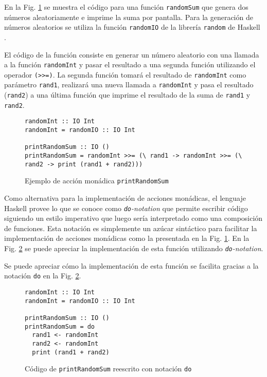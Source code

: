 En la Fig. \ref{fig:functional-randomSum} se muestra el código para una función \texttt{randomSum} que genera dos números aleatoriamente e imprime la suma por pantalla. Para la generación de números aleatorios se utiliza la función \texttt{randomIO} de la librería \texttt{random} de Haskell \cite{random}.

El código de la función consiste en generar un número aleatorio con una llamada a la función \texttt{randomInt} y pasar el resultado a una segunda función utilizando el operador \texttt{(>>=)}. La segunda función tomará el resultado de \texttt{randomInt} como parámetro \texttt{rand1}, realizará una nueva llamada a \texttt{randomInt} y pasa el resultado (\texttt{rand2}) a una última función que imprime el resultado de la suma de \texttt{rand1} y \texttt{rand2}.

\begin{figure}[!h]
  \centering
\begin{verbatim}
randomInt :: IO Int
randomInt = randomIO :: IO Int

printRandomSum :: IO ()
printRandomSum = randomInt >>= (\ rand1 -> randomInt >>= (\ rand2 -> print (rand1 + rand2)))
\end{verbatim}
  \caption{Ejemplo de acción monádica \texttt{printRandomSum}}
  \label{fig:functional-randomSum}
\end{figure}

Como alternativa para la implementación de acciones monádicas, el lenguaje Haskell  provee lo que se conoce como \emph{\texttt{do}-notation} que permite escribir código siguiendo un estilo imperativo que luego sería interpretado como una composición de funciones. Esta notación es simplemente un azúcar sintáctico para facilitar la implementación de acciones monádicas como la presentada en la Fig. \ref{fig:functional-randomSum}.
En la Fig. \ref{fig:do-randomSum} se puede apreciar la implementación de esta función utilizando \emph{\texttt{do}-notation}.

Se puede apreciar cómo la implementación de esta función se facilita gracias a la notación \texttt{do} en la Fig. \ref{fig:do-randomSum}.

\begin{figure}[!h]
  \centering
\begin{verbatim}
randomInt :: IO Int
randomInt = randomIO :: IO Int

printRandomSum :: IO ()
printRandomSum = do
  rand1 <- randomInt
  rand2 <- randomInt
  print (rand1 + rand2)
\end{verbatim}
  \caption{Código de \texttt{printRandomSum} reescrito con notación \texttt{do}}
  \label{fig:do-randomSum}
\end{figure}

